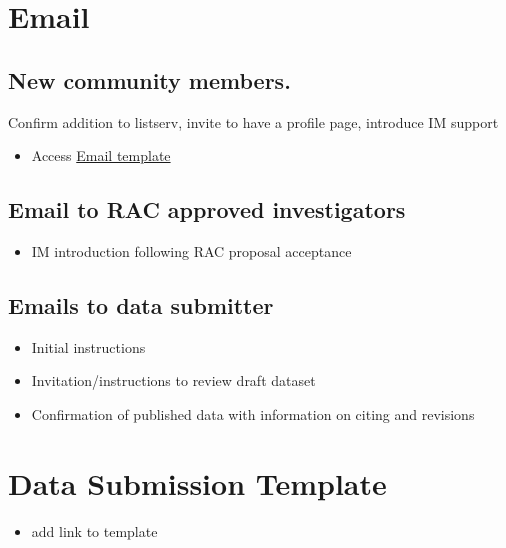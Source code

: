 \documentclass[
  letterpaper,
  DIV=11,
  numbers=noendperiod]{scrreprt}
\providecommand{\tightlist}{%
  \setlength{\itemsep}{0pt}\setlength{\parskip}{0pt}}\usepackage{longtable,booktabs,array}
\begin{document}
\section{Email}\label{email}

\subsection{New community members.}\label{new-community-members.}

Confirm addition to listserv, invite to have a profile page, introduce
IM support

\begin{itemize}
\tightlist
\item
  Access \href{Email_Welcome2HBR.qmd}{Email template}
\end{itemize}

\subsection{Email to RAC approved
investigators}\label{email-to-rac-approved-investigators}

\begin{itemize}
\tightlist
\item
  IM introduction following RAC proposal acceptance
\end{itemize}

\subsection{Emails to data submitter}\label{emails-to-data-submitter}

\begin{itemize}
\tightlist
\item
  Initial instructions
\item
  Invitation/instructions to review draft dataset
\item
  Confirmation of published data with information on citing and
  revisions
\end{itemize}

\section{Data Submission Template}\label{data-submission-template}

\begin{itemize}
\tightlist
\item
  add link to template
\end{itemize}
\end{document}
